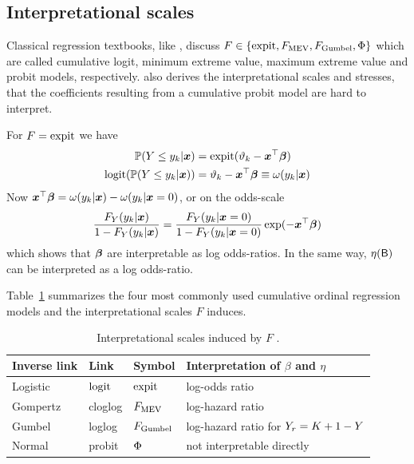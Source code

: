 \documentclass[article,nojss,shortnames]{jss}\usepackage[]{graphicx}\usepackage[]{color}
\begin{document}
\begin{appendix}
\section{Interpretational scales} \label{app:interpretation}

Classical regression textbooks, like \citet{tutz2011regression}, discuss
$F \in \{\operatorname{expit}, F_{\operatorname{MEV}}, F_{\text{Gumbel}}, \Phi\}$ which are called cumulative logit,
minimum extreme value, maximum extreme value and probit models, respectively.
\citet{tutz2011regression} also derives the interpretational scales and stresses,
that the coefficients resulting from a cumulative probit model are hard to interpret.

For $F = \operatorname{expit}$ we have
\begin{align*}
	\mathbb{P}(Y \leq y_k \rvert \boldsymbol x) &= \operatorname{expit}(\vartheta_k - \boldsymbol x^\top\text{\boldmath$\beta$}) \\
	\operatorname{logit}(\mathbb{P}(Y \leq y_k \rvert \boldsymbol x)) &= \vartheta_k - \boldsymbol x^\top\text{\boldmath$\beta$} \equiv \omega(y_k \rvert \boldsymbol x) \\
\end{align*}
Now $\boldsymbol x^\top\text{\boldmath$\beta$} = \omega(y_k \rvert \boldsymbol x) - \omega(y_k \rvert \boldsymbol x = 0)$, or on the
odds-scale
\begin{align*}
	\frac{F_Y(y_k \rvert \boldsymbol x)}{1 - F_Y(y_k \rvert \boldsymbol x)} =
		\frac{F_Y(y_k \rvert \boldsymbol x = 0)}{1 - F_Y(y_k \rvert \boldsymbol x = 0)}
		\exp(-\boldsymbol x^\top\text{\boldmath$\beta$})
\end{align*}
which shows that $\text{\boldmath$\beta$}$ are interpretable as log odds-ratios. In the same way,
$\eta(\mathsf{B})$ can be interpreted as a log odds-ratio.

Table~\ref{tab:interpretation} summarizes the four most commonly used cumulative
ordinal regression models and the interpretational scales $F$ induces.

\begin{table}
\centering
\caption{Interpretational scales induced by $F$ \citep{tutz2011regression}.} \label{tab:interpretation}
\begin{tabular}{llll}
\toprule
\textbf{Inverse link} & \textbf{Link} & \textbf{Symbol} &
  \textbf{Interpretation of} $\beta$ \textbf{and} $\eta$ \\ \midrule
Logistic & $\operatorname{logit}$ & $\operatorname{expit}$ & log-odds ratio \\
Gompertz & cloglog & $F_{\operatorname{MEV}}$ & log-hazard ratio \\
Gumbel & loglog & $F_{\text{Gumbel}}$ & log-hazard ratio for $Y_r = K + 1 - Y$\\
Normal & probit & $\Phi$ & not interpretable directly \\
\bottomrule
\end{tabular}
\end{table}


\end{appendix}
\end{document}
